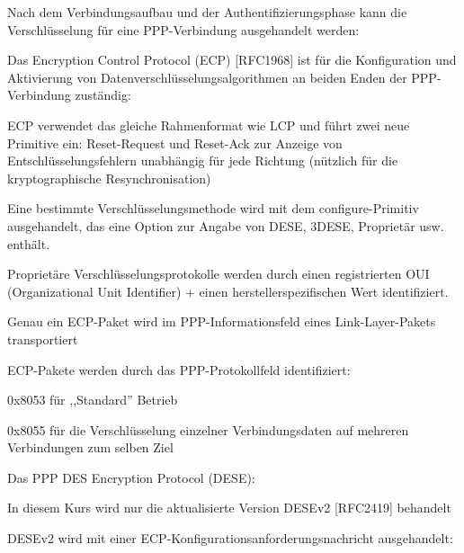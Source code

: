 \documentclass[a4paper]{article}
\begin{document}
\begin{multicols}{3}
      \begin{itemize*}
            \item Nach dem Verbindungsaufbau und der Authentifizierungsphase kann die
            Verschlüsselung für eine PPP-Verbindung ausgehandelt werden:
            \begin{itemize*}
                  \item Das Encryption Control Protocol (ECP) {[}RFC1968{]} ist für die Konfiguration und Aktivierung von Datenverschlüsselungsalgorithmen an beiden Enden der PPP-Verbindung zuständig:
                  \begin{itemize*} \item ECP verwendet das gleiche Rahmenformat wie LCP und führt zwei neue Primitive ein: Reset-Request und Reset-Ack zur Anzeige von Entschlüsselungsfehlern unabhängig für jede Richtung (nützlich für die kryptographische Resynchronisation) \item Eine bestimmte Verschlüsselungsmethode wird mit dem configure-Primitiv ausgehandelt, das eine Option zur Angabe von DESE, 3DESE, Proprietär usw. enthält. \item Proprietäre Verschlüsselungsprotokolle werden durch einen registrierten OUI (Organizational Unit Identifier) + einen herstellerspezifischen Wert identifiziert. \item Genau ein ECP-Paket wird im PPP-Informationsfeld eines Link-Layer-Pakets transportiert \item ECP-Pakete werden durch das PPP-Protokollfeld identifiziert:
                        \begin{itemize*} \item 0x8053 für ,,Standard'' Betrieb \item 0x8055 für die Verschlüsselung einzelner Verbindungsdaten auf mehreren Verbindungen zum selben Ziel \end{itemize*} \end{itemize*}
            \end{itemize*}
            \item Das PPP DES Encryption Protocol (DESE):
            \begin{itemize*}
                  \item In diesem Kurs wird nur die aktualisierte Version DESEv2 {[}RFC2419{]} behandelt
                  \item DESEv2 wird mit einer ECP-Konfigurationsanforderungsnachricht ausgehandelt:

\end{itemize*}
\end{itemize*}
\end{multicols}
\end{document}
